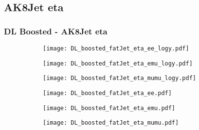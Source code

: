 \documentclass[aspectratio=169,8pt]{beamer}
\begin{document}
\subsection{AK8Jet eta}
\begin{frame}
\frametitle{DL Boosted - AK8Jet eta}
\begin{figure}
\captionsetup[subfigure]{labelformat=empty}
\begin{subfigure}{0.32\textwidth}
\texttt{[image: DL\_boosted\_fatJet\_eta\_ee\_logy.pdf]}
\vspace*{-0.15cm}
\end{subfigure}
\hfil
\begin{subfigure}{0.32\textwidth}
\texttt{[image: DL\_boosted\_fatJet\_eta\_emu\_logy.pdf]}
\vspace*{-0.15cm}
\end{subfigure}
\hfil
\begin{subfigure}{0.32\textwidth}
\texttt{[image: DL\_boosted\_fatJet\_eta\_mumu\_logy.pdf]}
\vspace*{-0.15cm}
\end{subfigure}
\hfil
\begin{subfigure}{0.32\textwidth}
\texttt{[image: DL\_boosted\_fatJet\_eta\_ee.pdf]}
\vspace*{-0.15cm}
\end{subfigure}
\hfil
\begin{subfigure}{0.32\textwidth}
\texttt{[image: DL\_boosted\_fatJet\_eta\_emu.pdf]}
\vspace*{-0.15cm}
\end{subfigure}
\hfil
\begin{subfigure}{0.32\textwidth}
\texttt{[image: DL\_boosted\_fatJet\_eta\_mumu.pdf]}
\vspace*{-0.15cm}
\end{subfigure}
\hfil
\end{figure}
\end{frame}
\newpage
\end{document}
